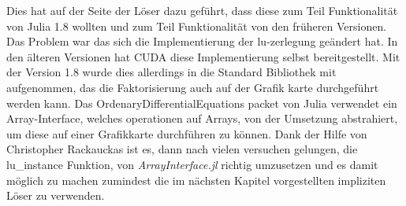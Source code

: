 Dies hat auf der Seite der Löser dazu geführt, dass diese zum Teil Funktionalität von Julia 1.8 wollten 
und zum Teil Funktionalität von den früheren Versionen.
Das Problem war das sich die Implementierung der lu-zerlegung geändert hat. %
In den älteren Versionen hat CUDA diese Implementierung selbst bereitgestellt.
Mit der Version 1.8 wurde dies allerdings in die Standard Bibliothek mit aufgenommen, das die Faktorisierung 
auch auf der Grafik karte durchgeführt werden kann.
Das OrdenaryDifferentialEquations packet von Julia verwendet 
ein Array-Interface, welches operationen auf Arrays, 
von der Umsetzung abstrahiert, um diese auf einer Grafikkarte durchführen zu können.
Dank der Hilfe von Christopher Rackauckas ist es, dann nach vielen versuchen gelungen, die lu\_instance Funktion, von \textit{ArrayInterface.jl} richtig umzusetzen 
und es damit möglich zu machen zumindest die im nächsten Kapitel vorgestellten impliziten Löser zu verwenden.


